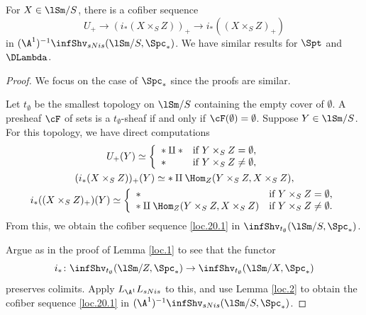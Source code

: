 \documentclass[10pt]{amsart}
\begin{document}
\begin{lem}
\label{loc.20}
For $X\in \lSm/S$, there is a cofiber sequence
\begin{equation}
\label{loc.20.1}
U_+
\to
(i_*(X\times_S Z))_+
\to
i_*((X\times_S Z)_+)
\end{equation}
in $(\A^1)^{-1}\infShv_{sNis}(\lSm/S,\Spc_*)$.
We have similar results for $\Spt$ and $\DLambda$.
\end{lem}
\begin{proof}
We focus on the case of $\Spc_*$ since the proofs are similar.

Let $t_\emptyset$ be the smallest topology on $\lSm/S$ containing the empty cover of $\emptyset$.
A presheaf $\cF$ of sets is a $t_\emptyset$-sheaf if and only if $\cF(\emptyset)=\emptyset$.
Suppose $Y\in \lSm/S$.
For this topology, we have direct computations
\begin{gather*}
U_+(Y)
\simeq
\left\{
\begin{array}{ll}
*\amalg * & \text{if } Y\times_S Z = \emptyset,
\\
*& \text{if } Y\times_S Z \neq  \emptyset,
\end{array}
\right.
\\
(i_*(X\times_S Z))_+(Y)
\simeq
*\amalg \Hom_Z(Y\times_S Z,X\times_S Z),
\\
i_*((X\times_S Z)_+)(Y)
\simeq
\left\{
\begin{array}{ll}
* & \text{if } Y\times_S Z=\emptyset,
\\
*\amalg \Hom_Z(Y\times_S Z,X\times_S Z) & \text{if } Y\times_S Z\neq \emptyset.
\end{array}
\right.
\end{gather*}
From this, we obtain the cofiber sequence \eqref{loc.20.1} in $\infShv_{t_\emptyset}(\lSm/S,\Spc_*)$.

Argue as in the proof of Lemma \ref{loc.1} to see that the functor
\[
i_*\colon \infShv_{t_\emptyset}(\lSm/Z,\Spc_*)\to \infShv_{t_\emptyset}(\lSm/X,\Spc_*)
\]
preserves colimits.
Apply $L_{\A^1}L_{sNis}$ to this, and use Lemma \ref{loc.2} to obtain the cofiber sequence \eqref{loc.20.1} in $(\A^1)^{-1}\infShv_{sNis}(\lSm/S,\Spc_*)$.
\end{proof}
\end{document}
